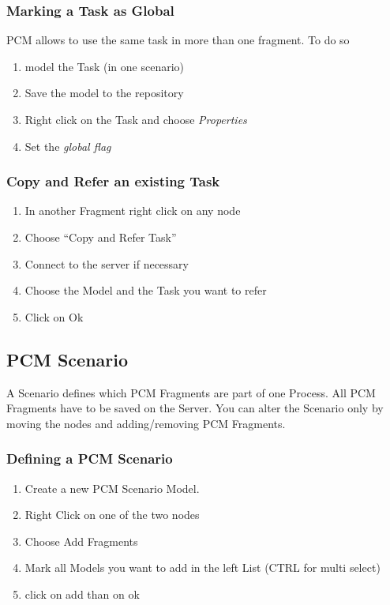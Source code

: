 %
%
\subsubsection{Marking a Task as Global}
\label{marking-a-task-as-global}
PCM allows to use the same task in more than one fragment. To do so

\begin{enumerate}
\def\labelenumi{\arabic{enumi}.}
\itemsep1pt\parskip0pt
\item
  model the Task (in one scenario)
\item
  Save the model to the repository
\item
  Right click on the Task and choose \emph{Properties}
\item
  Set the \emph{global flag}
\end{enumerate}

%
%
\subsubsection{Copy and Refer an existing Task}
\label{copy-and-refer-an-existing-task}

\begin{enumerate}
\def\labelenumi{\arabic{enumi}.}
\itemsep1pt\parskip0pt
\item
  In another Fragment right click on any node
\item
  Choose ``Copy and Refer Task''
\item
  Connect to the server if necessary
\item
  Choose the Model and the Task you want to refer
\item
  Click on Ok
\end{enumerate}

%
%
\subsection{PCM Scenario}
\label{pcm-scenario}
A Scenario defines which PCM Fragments are part of one Process. All PCM
Fragments have to be saved on the Server. You can alter the Scenario
only by moving the nodes and adding/removing PCM Fragments.

%
%
\subsubsection{Defining a PCM Scenario}
\label{defining-a-pcm-scenario}

\begin{enumerate}
\def\labelenumi{\arabic{enumi}.}
\itemsep1pt\parskip0pt
\item
  Create a new PCM Scenario Model.
\item
  Right Click on one of the two nodes
\item
  Choose Add Fragments
\item
  Mark all Models you want to add in the left List (CTRL for multi
  select)
\item
  click on add than on ok
\end{enumerate}

